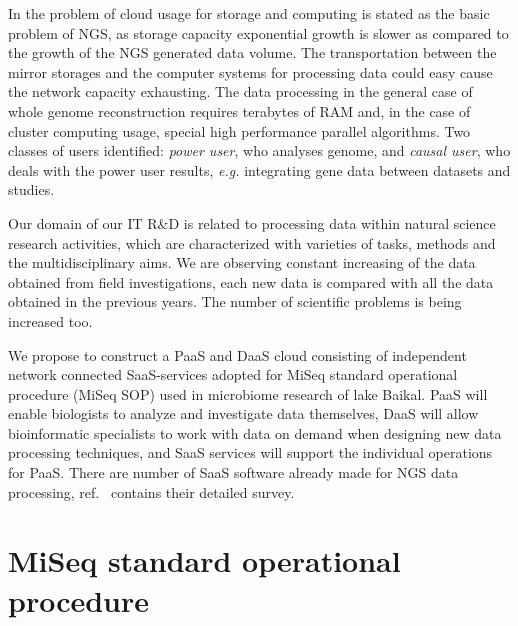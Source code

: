\documentclass[a4paper]{jpconf}
\begin{document}
In \cite{guo16} the problem of cloud usage for storage and computing is stated as the basic problem of NGS, as storage capacity exponential growth is slower as compared to the growth of the NGS generated data volume. The transportation between the mirror storages and the computer systems for processing data could easy cause the network capacity exhausting. The data processing in the general case of whole genome reconstruction requires terabytes of RAM and, in the case of cluster computing usage, special high performance parallel algorithms. Two classes of users identified: \emph{power user}, who analyses genome, and \emph{causal user}, who deals with the power user results, \emph{e.g.} integrating gene data between datasets and studies.


Our domain of our IT R\&D is related to processing data within natural science research activities, which are characterized with varieties of tasks, methods and the multidisciplinary aims. %
We are observing constant increasing of the data obtained from field investigations, each new data is compared with all the data obtained in the previous years. The number of scientific problems is being increased too.


We propose to construct a PaaS and DaaS cloud consisting of independent network connected SaaS-services adopted for MiSeq standard operational procedure (MiSeq SOP) used in microbiome research of lake Baikal. PaaS will enable biologists to analyze and investigate data themselves, DaaS will allow bioinformatic specialists to work with data on demand when designing new data processing techniques, and SaaS services will support the individual operations for PaaS. There are number of SaaS software already made for NGS data processing, ref.~\cite{guo16} contains their detailed survey. %



\section{MiSeq standard operational procedure}
\label{sec:sop}
\end{document}

